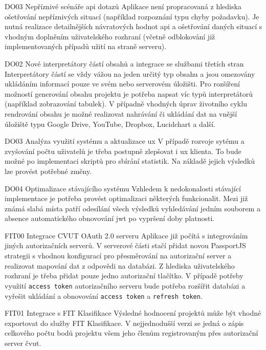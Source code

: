 \begin{dl}
   \item[DO03 Nepříznivé scénáře \gls{api} dotazů] 
   Aplikace není propracovaná z hlediska ošetřování nepříznivých situací (například rozpoznání typu chyby požadavku). Je nutná realizace detailnějších návratových hodnot \gls{api} a ošetřování daných situací s vhodným doplněním uživatelského rozhraní (včetně odblokování již implementovaných případů užití na straně serveru).

   \item[DO02 Nové interpretátory částí obsahů a integrace se službami třetích stran]
   Interpretátory částí se vždy vážou na jeden určitý typ obsahu a jsou omezovány ukládáním informací pouze ve svém nebo serverovém úložišti. Pro rozšíření možností generování obsahu projektu je potřeba napsat víc typů interpretátorů (například zobrazování tabulek). V případně vhodných úprav životního cyklu rendrování obsahu je možné realizovat nahrávání či ukládání dat na vnější úložiště typu Google Drive, YouTube, Dropbox, Lucidchart a další.

   \item[DO03 Analýza využití systému a aktualizace \gls{ux}]
   V případě rozvoje sytému a zvyšování počtu uživatelů je třeba postupně zlepšovat i \gls{ux} klienta. To bude možné po implementaci skriptů pro sbírání statistik. Na základě jejich výsledků lze provést potřebné změny.
   
   \item[DO04 Optimalizace stávajícího systému]
   Vzhledem k nedokonalosti stávající implementace je potřeba provést optimalizaci některých funkcionalit. Mezi již známá slabá místa patří odesílání všech výsledků vyhledávání jedním souborem a absence automatického obnovování \gls{jwt} po vypršení doby platnosti.
   
   \item[FIT00 Integrace CVUT OAuth 2.0 serveru]
   Aplikace již počítá s integrováním jiných autorizačních serverů. V serverové části stačí přidat novou PassportJS strategii s vhodnou konfigurací pro přesměrování na autorizační server a realizovat mapování dat z odpovědi na databázi. Z hlediska uživatelského rozhraní je třeba přidat pouze jedno autorizační tlačítko. V případě potřeby využití \texttt{access token} autorizačního serveru bude potřeba rozšířit databázi a vyřešit ukládání a obnovování \texttt{access token} a \texttt{refresh token}.

   \item[FIT01 Integrace s FIT Klasifikace]
   Výsledné hodnocení projektů může být vhodné exportovat do služby FIT Klasifikace. V nejjednodušší verzi se jedná o zápis celkového počtu bodů projektu všem jeho členům registrovaným přes autorizační server \gls{čvut}. 

\end{dl}
